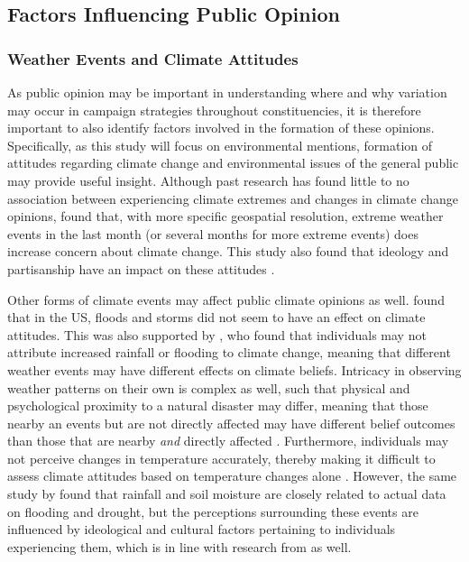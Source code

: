 \documentclass[preprint,12pt,authoryear]{elsarticle}
\begin{document}
\subsection{Factors Influencing Public Opinion}

\subsubsection{Weather Events and Climate Attitudes}

As public opinion may be important in understanding where and why variation may occur in campaign strategies throughout constituencies, it is therefore important to also identify factors involved in the formation of these opinions. Specifically, as this study will focus on environmental mentions, formation of attitudes regarding climate change and environmental issues of the general public may provide useful insight. Although past research has found little to no association between experiencing climate extremes and changes in climate change opinions, \citet{koniskyExtremeWeatherEvents2016} found that, with more specific geospatial resolution, extreme weather events in the last month (or several months for more extreme events) does increase concern about climate change. This study also found that ideology and partisanship have an impact on these attitudes \citep{koniskyExtremeWeatherEvents2016}. 

Other forms of climate events may affect public climate opinions as well. \citet{viscontiEffectDifferentExtreme2024} found that in the US, floods and storms did not seem to have an effect on climate attitudes. This was also supported by \citet{loComeRainShine2015}, who found that individuals may not attribute increased rainfall or flooding to climate change, meaning that different weather events may have different effects on climate beliefs. Intricacy in observing weather patterns on their own is complex as well, such that physical and psychological proximity to a natural disaster may differ, meaning that those nearby an events but are not directly affected may have different belief outcomes than those that are nearby \textit{and} directly affected \citep{siscoEffectsWeatherExperiences2021}. Furthermore, individuals may not perceive changes in temperature accurately, thereby making it difficult to assess climate attitudes based on temperature changes alone \citep{goebbertWeatherClimateWorldviews2012}. However, the same study by \citet{goebbertWeatherClimateWorldviews2012} found that rainfall and soil moisture are closely related to actual data on flooding and drought, but the perceptions surrounding these events are influenced by ideological and cultural factors pertaining to individuals experiencing them, which is in line with research from \citet{osberghausNaturalDisastersClimate2022} as well. 
\end{document}
